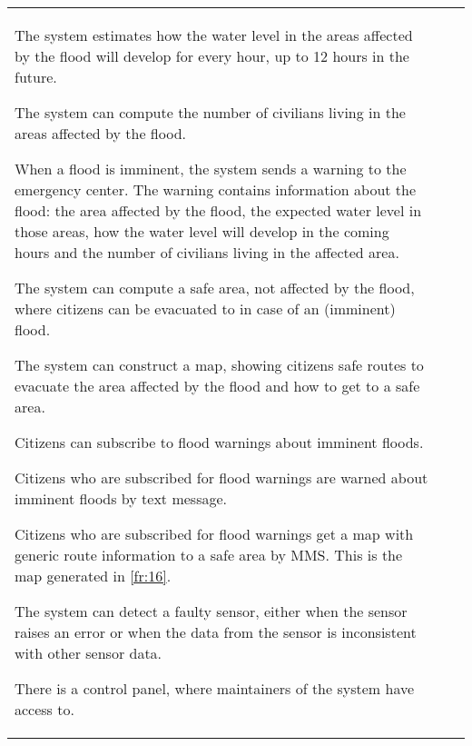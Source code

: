 \begin{longtable}{L{0.1\textwidth} L{0.12\textwidth} L{0.78\textwidth}}
    { The system estimates how the water level in the areas affected by the flood will develop for every hour, up to 12 hours in the future. } %
    
    { The system can compute the number of civilians living in the areas affected by the flood. }
    
	{ When a flood is imminent, the system sends a warning to the emergency center. The warning contains information about the flood: the area affected by the flood, the expected water level in those areas, how the water level will develop in the coming hours and the number of civilians living in the affected area. }
    
    { The system can compute a safe area, not affected by the flood, where citizens can be evacuated to in case of an (imminent) flood. }
    
    { The system can construct a map, showing citizens safe routes to evacuate the area affected by the flood and how to get to a safe area. }
    
    { Citizens can subscribe to flood warnings about imminent floods. }
    
    { Citizens who are subscribed for flood warnings are warned about imminent floods by text message. }
    
    { Citizens who are subscribed for flood warnings get a map with generic route information to a safe area by MMS. This is the map generated in \ref{fr:16}. }
	
    { The system can detect a faulty sensor, either when the sensor raises an error or when the data from the sensor is inconsistent with other sensor data. }
    
    { There is a control panel, where maintainers of the system have access to. }  %
    

\end{longtable}
